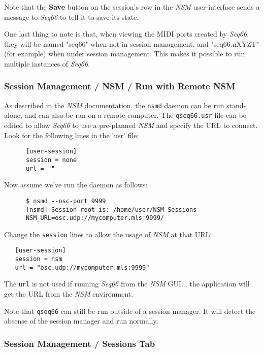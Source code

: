    Note that the \textbf{Save} button on the session's row in the
   \textsl{NSM} user-interface sends a message to \textsl{Seq66}
   to tell it to save its state.

   One last thing to note is that, when viewing the MIDI ports created by
   \textsl{Seq66}, they will be named "seq66" when not in session management,
   and "seq66.nXYZT" (for example) when under session management.  This makes
   it possible to run multiple instances of \textsl{Seq66}.

\subsubsection{Session Management / NSM / Run with Remote NSM}
\label{subsec:sessions_nsm_before_using_nsm}

   As described in the \textsl{NSM} documentation, the \texttt{nsmd} daemon can
   be run stand-alone, and can also be ran on a remote computer.
   The \texttt{qseq66.usr} file can be edited to allow \textsl{Seq66} to
   use a pre-planned \textsl{NSM} and specify the URL to connect.
   Look for the following lines in the 'usr' file:

   \begin{verbatim}
      [user-session]
      session = none
      url = ""
   \end{verbatim}

   Now assume we've run the daemon as follows:

   \begin{verbatim}
      $ nsmd --osc-port 9999
      [nsmd] Session root is: /home/user/NSM Sessions
      NSM_URL=osc.udp://mycomputer.mls:9999/
   \end{verbatim}

   Change the \texttt{session} lines to allow the usage of
   \textsl{NSM} at that URL:

\begin{verbatim}
   [user-session]
   session = nsm
   url = "osc.udp://mycomputer.mls:9999"
\end{verbatim}

   The \texttt{url} is not used if running \textsl{Seq66} from the \textsl{NSM}
   GUI... the application will get the URL from the \textsl{NSM} environment.

   Note that \texttt{qseq66} can still be run outside of a
   session manager.  It will detect the absense of the session manager and run
   normally.

\subsubsection{Session Management / Sessions Tab}
\label{subsubsec:sessions_tab}

